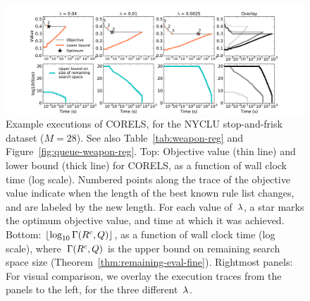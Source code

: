 \begin{figure}[t!]
\begin{center}
\includegraphics[trim={35mm 0mm 35mm 15mm},
width=\textwidth]{figs/weapon_reg-execution.pdf}
\end{center}
\vspace{-5mm}
\caption{Example executions of CORELS, for the NYCLU stop-and-frisk dataset (${M = 28}$).
%
See also Table~\ref{tab:weapon-reg} and Figure~\ref{fig:queue-weapon-reg}.
%
Top: Objective value (thin line) and lower bound (thick line) for CORELS,
as a function of wall clock time (log scale).
%
Numbered points along the trace of the objective value
indicate when the length of the best known rule list changes,
and are labeled by the new length.
%
For each value of~${\lambda}$, a star marks the optimum objective value,
and time at which it was achieved.
%
Bottom: $\lfloor \log_{10} \Gamma({R^c}, Q) \rfloor$,
as a function of wall clock time (log scale),
where~$\Gamma({R^c}, Q)$
is the upper bound on remaining search space size
(Theorem~\ref{thm:remaining-eval-fine}).
%
Rightmost panels: For visual comparison, we overlay the execution traces
from the panels to the left, for the three different~${\lambda}$.
}
\label{fig:weapon-reg-execution}
\end{figure}

